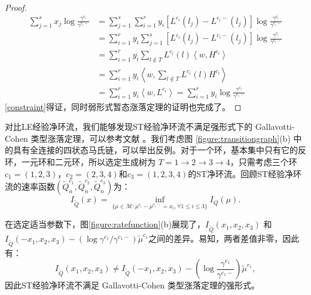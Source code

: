 \begin{proof}
\begin{equation*}
    \begin{aligned}
    \sum_{j=1}^{s} x_{j} \log \frac{\gamma^{c_{i}}}{\gamma^{c_{i}-}} &=\sum_{j=1}^{s} \sum_{i=1}^{r} y_{i}\left[L^{c_{i}}\left(l_{j}\right)-L^{c_{i}-}\left(l_{j}\right)\right] \log \frac{\gamma^{c_{i}}}{\gamma^{c_{i}-}} \\
    &=\sum_{i=1}^{r} y_{i} \sum_{j=1}^{s}\left[L^{c_{i}}\left(l_{j}\right)-L^{c_{i}-}\left(l_{j}\right)\right] \log \frac{\gamma^{c_{i}}}{\gamma^{c_{i}-}} \\
    &=\sum_{i=1}^{r} y_{i} \sum_{l \notin T} L^{c_{i}}(l)\left\langle w, H^{c_{l}}\right\rangle \\
    &=\sum_{i=1}^{r} y_{i}\left\langle w, \sum_{l \notin T} L^{c_{i}}(l) H^{c_{l}}\right\rangle \\
    &=\sum_{i=1}^{r} y_{i}\left\langle w, L^{c_{i}}\right\rangle=\sum_{i=1}^{r} y_{i} \log \frac{\gamma^{c_{i}}}{\gamma^{c_{i}-}}
    \end{aligned}
\end{equation*}
\ref{constraint}得证，同时弱形式暂态涨落定理的证明也完成了。

\end{proof}



对比LE经验净环流，我们能够发现ST经验净环流不满足强形式下的 Gallavotti-Cohen 类型涨落定理，可以参考文献 \cite{mehl2012role,polettini2017effective,uhl2018fluctuations,kahlen2018hidden}。我们考虑图 \ref{figure:transitiongraph}(b) 中的具有全连接的四状态马氏链，可以举出反例。对于一个环，基本集中只有它的反环，一元环和二元环，所以选定生成树为 $T=1\to2\to3\to4$，只需考虑三个环$c_1=(1,2,3)$，$c_2=(2,3,4)$和$c_3=(1,2,3,4)$的ST净环流。回顾ST经验净环流的速率函数$(\tilde{Q}_n^{c_1}, \tilde{Q}_n^{c_2}, \tilde{Q}_n^{c_3})$为：
\begin{equation}
	I_{\tilde{Q}}(x)=\inf_{\{\mu\in\mathcal{M}:\mu^{c_i}-\mu^{c_i-}= x_i,\forall 1\le i\le 3\}}I_Q(\mu).
\end{equation}

在选定适当参数下，图\ref{figure:ratefunction}(b)展现了，$I_{\tilde{Q}}(x_1, x_2, x_3)$ 和 $ I_{\tilde{Q}}(-x_1, x_2, x_3) -\left(\log \gamma^{c_1} / \gamma^{c_1-}\right)\tilde{\mu}^{c_1}$之间的差异。易知，两者差值非零，因此有：
\begin{equation}
    I_{\tilde{Q}}(x_1, x_2, x_3) \neq I_{\tilde{Q}}(-x_1, x_2, x_3) -\left(\log\frac{\gamma^{c_1}}{\gamma^{c_1-}}\right)\tilde{\mu}^{c_1},
\end{equation}
因此ST经验净环流不满足 Gallavotti-Cohen 类型涨落定理的强形式。